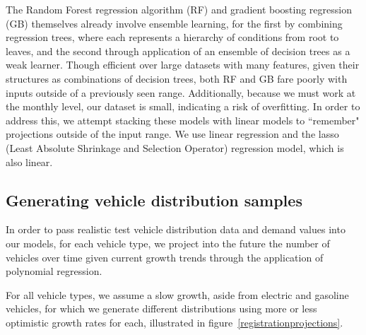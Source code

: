 \documentclass{article}
\begin{document}
The Random Forest regression algorithm (RF) and gradient boosting regression (GB) themselves already involve ensemble learning, for the first by combining regression trees, where each represents a hierarchy of conditions from root to leaves, \citep{breiman:rf} and the second through application of an ensemble of decision trees as a weak learner. Though efficient over large datasets with many features, given their structures as combinations of decision trees, both RF and GB fare poorly with inputs outside of a previously seen range. Additionally, because we must work at the monthly level, our dataset is small, indicating a risk of overfitting. In order to address this, we attempt stacking these models with linear models to ``remember" projections outside of the input range. We use linear regression and the lasso (Least Absolute Shrinkage and Selection Operator) regression model, which is also linear.

\subsection{Generating vehicle distribution samples}
In order to pass realistic test vehicle distribution data and demand values into our models, for each vehicle type, we project into the future the number of vehicles over time given current growth trends through the application of polynomial regression.

For all vehicle types, we assume a slow growth, aside from electric and gasoline vehicles, for which we generate different distributions using more or less optimistic growth rates for each, illustrated in figure~\ref{registrationprojections}.
\end{document}
